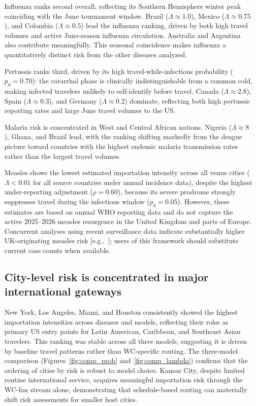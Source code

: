 \documentclass[12pt]{article}
\begin{document}
Influenza ranks second overall, reflecting its Southern Hemisphere
winter peak coinciding with the June tournament window. Brazil
($\Lambda \approx 1.0$), Mexico ($\Lambda \approx 0.75$), and
Colombia ($\Lambda \approx 0.5$) lead the influenza ranking, driven
by both high travel volumes and active June-season influenza
circulation. Australia and Argentina also contribute meaningfully.
This seasonal coincidence makes influenza a quantitatively distinct
risk from the other diseases analyzed.

Pertussis ranks third, driven by its high travel-while-infectious
probability ($p_d=0.70$): the catarrhal phase is clinically
indistinguishable from a common cold, making infected travelers
unlikely to self-identify before travel. Canada ($\Lambda \approx
2.8$), Spain ($\Lambda \approx 0.3$), and Germany ($\Lambda \approx
0.2$) dominate, reflecting both high pertussis reporting rates and
large June travel volumes to the US.

Malaria risk is concentrated in West and Central African nations.
Nigeria ($\Lambda \approx 8$), Ghana, and Brazil lead, with the
ranking shifting markedly from the dengue picture toward countries
with the highest endemic malaria transmission rates rather than the
largest travel volumes.

Measles shows the lowest estimated importation intensity across all
venue cities ($\Lambda < 0.01$ for all source countries under annual
incidence data), despite the highest under-reporting adjustment
($\rho=0.60$), because its severe prodrome strongly suppresses
travel during the infectious window ($p_d=0.05$). However, these
estimates are based on annual WHO reporting data and do not capture
the active 2025--2026 measles resurgence in the United Kingdom and
parts of Europe. Concurrent analyses using recent surveillance data
indicate substantially higher UK-originating measles risk
[e.g.,~\cite{epistorm2026}]; users of this framework should
substitute current case counts when available.

\subsection*{City-level risk is concentrated in major international gateways}

New York, Los Angeles, Miami, and Houston consistently showed the
highest importation intensities across diseases and models, reflecting
their roles as primary US entry points for Latin American, Caribbean,
and Southeast Asian travelers. This ranking was stable across all
three models, suggesting it is driven by baseline travel patterns
rather than WC-specific routing. The three-model comparison
(Figures~\ref{fig:comp_prob} and~\ref{fig:comp_lambda}) confirms that
the ordering of cities by risk is robust to model choice. Kansas City,
despite limited routine international service, acquires meaningful
importation risk through the WC-fan stream alone, demonstrating that
schedule-based routing can materially shift risk assessments for
smaller host cities.
\end{document}
